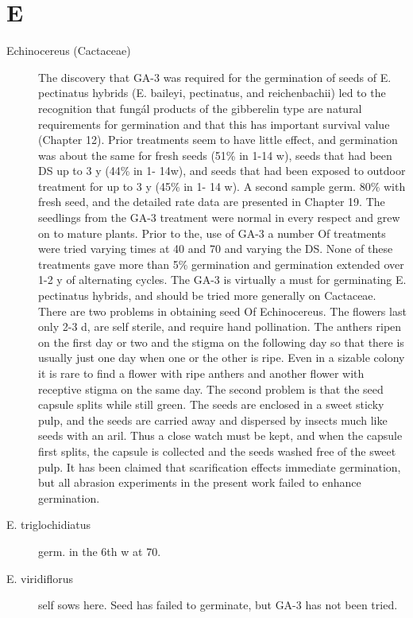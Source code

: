 \section{E}
\begin{description}

\item[Echinocereus (Cactaceae)] The discovery that GA-3 was required for the
germination of seeds of E. pectinatus hybrids (E. baileyi, pectinatus, and
reichenbachii) led to the recognition that fungál products of the gibberelin type are
natural requirements for germination and that this has important survival value
(Chapter 12). Prior treatments seem to have little effect, and germination was about
the same for fresh seeds (51\% in 1-14 w), seeds that had been DS up to 3 y (44\% in 1-
14w), and seeds that had been exposed to outdoor treatment for up to 3 y (45\% in 1-
14 w). A second sample germ. 80\% with fresh seed, and the detailed rate data are
presented in Chapter 19. The seedlings from the GA-3 treatment were normal in every
respect and grew on to mature plants. Prior to the, use of GA-3 a number Of treatments
were tried varying times at 40 and 70 and varying the DS. None of these treatments
gave more than 5\% germination and germination extended over 1-2 y of alternating
cycles. The GA-3 is virtually a must for germinating E. pectinatus hybrids, and should
be tried more generally on Cactaceae. There are two problems in obtaining seed Of
Echinocereus. The flowers last only 2-3 d, are self sterile, and require hand pollination.
The anthers ripen on the first day or two and the stigma on the following day so that
there is usually just one day when one or the other is ripe. Even in a sizable colony it
is rare to find a flower with ripe anthers and another flower with receptive stigma on the
same day. The second problem is that the seed capsule splits while still green. The
seeds are enclosed in a sweet sticky pulp, and the seeds are carried away and
dispersed by insects much like seeds with an aril. Thus a close watch must be kept,
and when the capsule first splits, the capsule is collected and the seeds washed free
of the sweet pulp. It has been claimed that scarification effects immediate germination,
but all abrasion experiments in the present work failed to enhance germination.

\item[E. triglochidiatus] germ. in the 6th w at 70.
\item[E. viridiflorus] self sows here. Seed has failed to germinate, but GA-3 has not
been tried.


\end{description}

